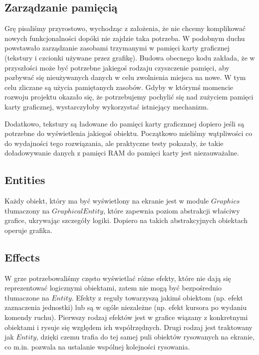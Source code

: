 \documentclass[licencjacka]{pracamgr}
\begin{document}
    \subsection{Zarządzanie pamięcią}
      Grę pisaliśmy przyrostowo, wychodząc z założenia, że nie chcemy komplikować nowych funkcjonalności dopóki nie
      zajdzie taka potrzeba. W podobnym duchu powstawało zarządzanie zasobami trzymanymi w pamięci karty graficznej
      (tekstury i czcionki używane przez grafikę). Budowa obecnego kodu zakłada, że w przyszłości może być potrzebne
      jakiegoś rodzaju czyszczenie pamięci, aby pozbywać się nieużywanych danych w celu zwolnienia miejsca na nowe.
      W tym celu zliczane są użycia pamiętanych zasobów. Gdyby w którymś momencie rozwoju projektu okazało się, że
      potrzebujemy pochylić się nad zużyciem pamięci karty graficznej, wystarczyłoby wykorzystać istniejący mechanizm.

      Dodatkowo, tekstury są ładowane do pamięci karty graficznnej dopiero jeśli są potrzebne do wyświetlenia jakiegoś
      obiektu. Początkowo mieliśmy wątpliwości co do wydajności tego rozwiązania, ale praktyczne testy pokazały, że
      takie doładowywanie danych z pamięci RAM do pamięci karty jest niezauważalne.

    \subsection{Entities}
      Każdy obiekt, który ma być wyświetlony na ekranie jest w module $Graphics$ tłumaczony na $GraphicalEntity$, które
      zapewnia poziom abstrakcji właściwy grafice, ukrywając szczegóły logiki. Dopiero na takich abstrakcyjnych
      obiektach operuje grafika.

    \subsection{Effects}
      W grze potrzebowaliśmy często wyświetlać różne efekty, które nie dają się reprezentować logicznymi obiektami,
      zatem nie mogą być bezpośrednio tłumaczone na $Entity$. Efekty z reguły towarzyszą jakimś obiektom (np. efekt
      zaznaczenia jednostki) lub są w ogóle niezależne (np. efekt kursora po wydaniu komendy ruchu). Pierwszy rodzaj
      efektów jest w grafice wiązany z konkretnymi obiektami i rysuje się względem ich współrzędnych. Drugi rodzaj jest
      traktowany jak $Entity$, dzięki czemu trafia do tej samej puli obiektów rysowanych na ekranie, co m.in. pozwala na
      ustalanie wspólnej kolejności rysowania.
\end{document}
